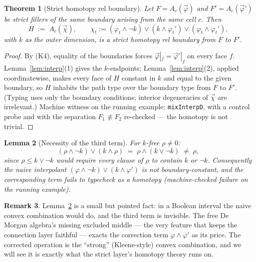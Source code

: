 \documentclass[11pt]{amsart}
\newtheorem{thm}{Theorem}[section]
\newtheorem{lem}[thm]{Lemma}
\theoremstyle{definition}
\newtheorem{rem}[thm]{Remark}
\newcommand{\nconv}{\not\equiv}
\newcommand{\act}[1]{A_{#1}}
\begin{document}
\begin{thm}[Strict homotopy rel boundary]\label{thm:homotopy}
  Let $F = \act{c}(\vec\varphi)$ and $F' = \act{c}(\vec\varphi')$
  be strict fillers of the same boundary arising from the same cell
  $c$.  Then
  \[
    H \;:=\; \act{c}(\vec\chi), \qquad
    \chi_t := (\varphi_t \wedge \neg k) \vee (k \wedge \varphi_t')
    \vee (\varphi_t \wedge \varphi_t'),
  \]
  with $k$ as the outer dimension, is a strict homotopy rel
  boundary from $F$ to $F'$.
\end{thm}
\begin{proof}
  By (K4), equality of the boundaries forces
  $\vec\varphi|_f = \vec\varphi'|_f$ on every face $f$.
  Lemma~\ref{lem:interp}(1) gives the $k$-endpoints;
  Lemma~\ref{lem:interp}(2), applied coordinatewise, makes every
  face of $H$ constant in $k$ and equal to the given boundary, so
  $H$ inhabits the path type over the boundary type from $F$ to
  $F'$.  (Typing uses only the boundary conditions; interior
  degeneracies of $\vec\chi$ are irrelevant.)  Machine witness on
  the running example: \texttt{mixInterpD}, with a control probe
  and with the separation $F_1 \nconv F_2$ re-checked --- the
  homotopy is not trivial.
\end{proof}

\begin{lem}[Necessity of the third term]\label{lem:necessity}
  For $k$-free $\rho \ne 0$:
  \[
    (\rho \wedge \neg k) \vee (k \wedge \rho)
    \;=\; \rho \wedge (k \vee \neg k) \;\ne\; \rho ,
  \]
  since $\rho \le k \vee \neg k$ would require every clause of
  $\rho$ to contain $k$ or $\neg k$.  Consequently the naive
  interpolant $(\varphi \wedge \neg k) \vee (k \wedge \varphi')$ is
  \emph{not} boundary-constant, and the corresponding term fails to
  typecheck as a homotopy (machine-checked failure on the running
  example).
\end{lem}

\begin{rem}
  Lemma~\ref{lem:necessity} is a small but pointed fact: in a
  Boolean interval the naive convex combination would do, and the
  third term is invisible.  The free De Morgan algebra's missing
  excluded middle --- the very feature that keeps the connection
  layer faithful \cite{Sphere} --- exacts the correction term
  $\varphi \wedge \varphi'$ as its price.  The corrected operation
  is the ``strong'' (Kleene-style) convex combination, and we will
  see it is exactly what the strict layer's homotopy theory runs
  on.
\end{rem}
\end{document}
